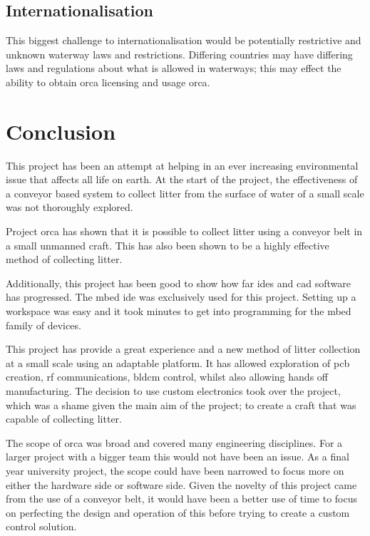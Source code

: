 \documentclass [12pt]{article}
\begin{document}
\subsection{Internationalisation}
 This biggest challenge to internationalisation would be potentially restrictive and unknown waterway laws and restrictions. Differing countries may have differing laws and regulations about what is allowed in waterways; this may effect the ability to obtain \gls{orca} licensing and usage \gls{orca}.

\section{Conclusion}
This project has been an attempt at helping in an ever increasing environmental issue that affects all life on earth. At the start of the project, the effectiveness of a conveyor based system to collect litter from the surface of water of a small scale was not thoroughly explored. 

Project \gls{orca} has shown that it is possible to collect litter using a conveyor belt in a small unmanned craft. This has also been shown to be a highly effective method of collecting litter. 

Additionally, this project has been good to show how far \gls{ide}s and \gls{cad} software has progressed. The \gls{mbed} \gls{ide} was exclusively used for this project. Setting up a workspace was easy and it took minutes to get into programming for the \gls{mbed} family of devices. 

This project has provide a great experience and a new method of litter collection at a small scale using an adaptable platform. It has allowed exploration of \gls{pcb} creation, \gls{rf} communications, \gls{bldcm} control, whilst also allowing hands off manufacturing. The decision to use custom electronics took over the project, which was a shame given the main aim of the project; to create a craft that was capable of collecting litter. 

The scope of \gls{orca} was broad and covered many engineering disciplines. For a larger project with a bigger team this would not have been an issue. As a final year university project, the scope could have been narrowed to focus more on either the hardware side or software side. Given the novelty of this project came from the use of a conveyor belt, it would have been a better use of time to focus on perfecting the design and operation of this before trying to create a custom control solution. 
\end{document}
